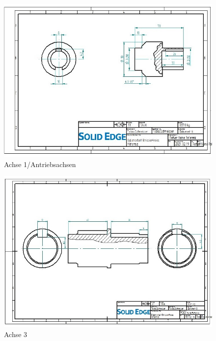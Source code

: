 \begin{figure} [H]
	\begin{center}
		\includegraphics[angle=90]{figures/mechanik/Antriebsachse_Zeichnung.jpg}
		\caption{Achse 1/Antriebsachsen}
		\label{fig:Achse 1/Antriebsachsen}
	\end{center}
\end{figure}


\begin{figure} [H]
	\begin{center}
		\includegraphics[angle=90]{figures/mechanik/Achse_mit_nuten_Zeichnung.jpg}
		\caption{Achse 3}
		\label{fig:Achse3}
	\end{center}
\end{figure}


